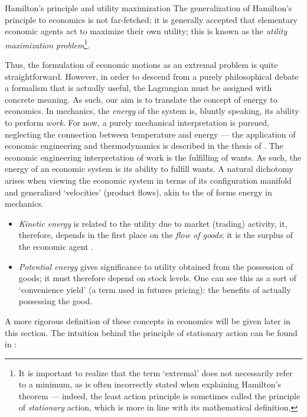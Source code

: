 \begin{econ}{Hamilton's principle and utility maximization}
    The generalization of Hamilton's principle to economics is not far-fetched; it is generally accepted that elementary economic agents act to maximize their own utility; this is known as the \emph{utility maximization problem}\footnote{It is important to realize that the term `extremal' does not necessarily refer to a minimum, as is often incorrectly stated when explaining Hamilton's theorem --- indeed, the least action principle is sometimes called the principle of \emph{stationary} action, which is more in line with its mathematical definition.}. \\

    Thus, the formulation of economic motions as an extremal problem is quite straightforward. However, in order to descend from a purely philosophical debate a formalism that is actually useful, the Lagrangian must be assigned with concrete meaning. As such, our aim is to translate the concept of energy to economics. In mechanics, the \emph{energy} of the system is, bluntly speaking, its ability to perform \emph{work}. For now, a purely mechanical interpretation is pursued, neglecting the connection between temperature and energy --- the application of economic engineering and thermodynamics is described in the thesis of \citet{Manders2019}. The economic engineering interpretation of work is the fulfilling of wants. As such, the energy of an economic system is its ability to fulfill wants. A natural dichotomy arises when viewing the economic system in terms of its configuration manifold and generalized `velocities' (product flows), akin to the of forms energy in mechanics.
    \begin{itemize}
        \item \emph{Kinetic energy} is related to the utility due to market (trading) activity, it, therefore, depends in the first place on the \emph{flow of goods}; it is the surplus of the economic agent \cite{Mankiw2017}.
        \item \emph{Potential energy} gives significance to utility obtained from the possession of goods; it must therefore depend on stock levels. One can see this as a sort of `convenience yield' (a term used in futures pricing): the benefits of actually possessing the good.
    \end{itemize}
    A more rigorous definition of these concepts in economics will be given later in this section. The intuition behind the principle of stationary action can be found in \citet{Feynman2010}:

\end{econ}
